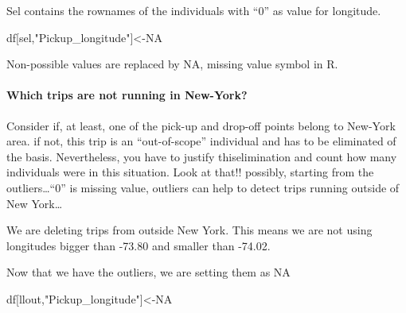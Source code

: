 \documentclass[
  18pt,
  a4paper]{article}
\newenvironment{Shaded}{\begin{snugshade}}{\end{snugshade}}
\newcommand{\CommentTok}[1]{\textcolor[rgb]{0.56,0.35,0.01}{\textit{#1}}}
\newcommand{\DecValTok}[1]{\textcolor[rgb]{0.00,0.00,0.81}{#1}}
\newcommand{\FloatTok}[1]{\textcolor[rgb]{0.00,0.00,0.81}{#1}}
\newcommand{\KeywordTok}[1]{\textcolor[rgb]{0.13,0.29,0.53}{\textbf{#1}}}
\newcommand{\NormalTok}[1]{#1}
\newcommand{\OperatorTok}[1]{\textcolor[rgb]{0.81,0.36,0.00}{\textbf{#1}}}
\newcommand{\OtherTok}[1]{\textcolor[rgb]{0.56,0.35,0.01}{#1}}
\newcommand{\StringTok}[1]{\textcolor[rgb]{0.31,0.60,0.02}{#1}}
\begin{document}
Sel contains the rownames of the individuals with ``0'' as value for
longitude.

\begin{Shaded}
\begin{Highlighting}[]
\NormalTok{df[sel,}\StringTok{"Pickup_longitude"}\NormalTok{]<-}\OtherTok{NA}   
\end{Highlighting}
\end{Shaded}

Non-possible values are replaced by NA, missing value symbol in R.

\hypertarget{which-trips-are-not-running-in-new-york}{%
\paragraph{Which trips are not running in
New-York?}\label{which-trips-are-not-running-in-new-york}}

Consider if, at least, one of the pick-up and drop-off points belong to
New-York area. if not, this trip is an ``out-of-scope'' individual and
has to be eliminated of the basis. Nevertheless, you have to justify
thiselimination and count how many individuals were in this situation.
Look at that!! possibly, starting from the outliers\ldots{}``0'' is
missing value, outliers can help to detect trips running outside of New
York\ldots{}

We are deleting trips from outside New York. This means we are not using
longitudes bigger than -73.80 and smaller than -74.02.

\begin{Shaded}
\end{Shaded}

Now that we have the outliers, we are setting them as NA

\begin{Shaded}
\begin{Highlighting}[]
\NormalTok{df[llout,}\StringTok{"Pickup_longitude"}\NormalTok{]<-}\OtherTok{NA}
\end{Highlighting}
\end{Shaded}
\end{document}
